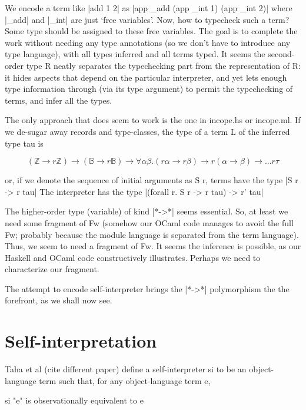 \documentclass[preprint]{sigplanconf}
\let\cite=\citep
\newcommand{\ZZ}{\mathbb{Z}}
\newcommand{\BB}{\mathbb{B}}
\begin{document}
We encode a term like |add 1 2| as
|app _add (app _int 1) (app _int 2)| where |_add| and |_int| are just
`free variables'. Now, how to typecheck such a term? Some type should
be assigned to these free variables. The goal is to complete the work
without needing any type annotations (so we don't have to introduce any
type language), with all types inferred and all terms typed. It seems
the second-order type R neatly separates the typechecking part from
the representation of R: it hides aspects that depend on the
particular interpreter, and yet lets enough type information through
(via its type argument) to permit the typechecking of terms, and infer
all the types. 



The only approach that does seem to work
is the one in incope.hs or incope.ml. If we de-sugar away records and
type-classes, the type of a term L of the inferred type tau is

$$ 
  (\ZZ \rightarrow r \ZZ) \rightarrow
  (\BB \rightarrow r \BB) \rightarrow
  \forall \alpha \beta. (r \alpha \rightarrow r \beta)
      \rightarrow r (\alpha\rightarrow\beta) \rightarrow ... r \tau
$$

or, if we denote the sequence of initial arguments as S r, terms have
the type |S r -> r tau|
The interpreter has the type
|(forall r. S r -> r tau) -> r' tau|

The higher-order type (variable) of kind |*->*| seems essential. So, at
least we need some fragment of Fw (somehow our OCaml code manages to
avoid the full Fw; probably because the module language is separated
from the term language). Thus, we seem to need a fragment of Fw. It
seems the inference is possible, as our Haskell and OCaml code
constructively illustrates. Perhaps we need to characterize our
fragment.

The attempt to encode self-interpreter brings the |*->*| polymorphism
the the forefront, as we shall now see.

\section{Self-interpretation}\cite{selfinterp}

Taha et al (cite different paper) define a self-interpreter si to be an
object-language term such that, for any object-language term e,

\begin{code}
  si "e"    is observationally equivalent to    e
\end{code}
\end{document}
